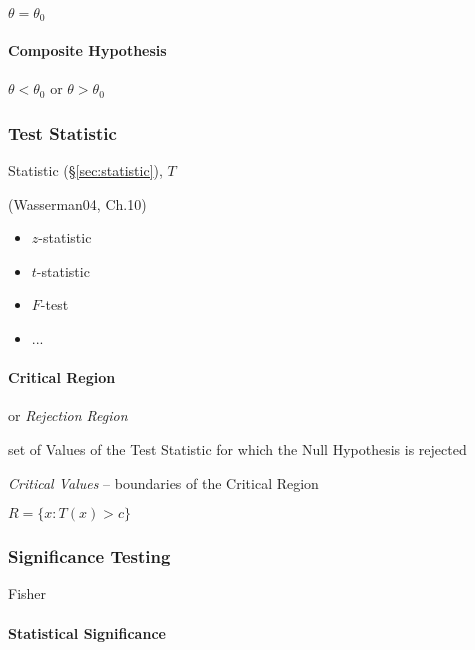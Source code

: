 $\theta = \theta_0$



\paragraph{Composite Hypothesis}\label{sec:composite_hypothesis}\hfill

$\theta < \theta_0$ or $\theta > \theta_0$



\subsubsection{Test Statistic}\label{sec:test_statistic}

Statistic (\S\ref{sec:statistic}), $T$

(Wasserman04, Ch.10)

\begin{itemize}
  \item $z$-statistic
  \item $t$-statistic
  \item $F$-test
  \item ...
\end{itemize}



\paragraph{Critical Region}\label{sec:critical_region}\hfill

or \emph{Rejection Region}

set of Values of the Test Statistic for which the Null Hypothesis is rejected

\emph{Critical Values} -- boundaries of the Critical Region

$R = \{ x : T(x) > c \}$



\subsubsection{Significance Testing}\label{sec:significance_testing}

Fisher



\paragraph{Statistical Significance}\label{sec:statistical_significance}\hfill


